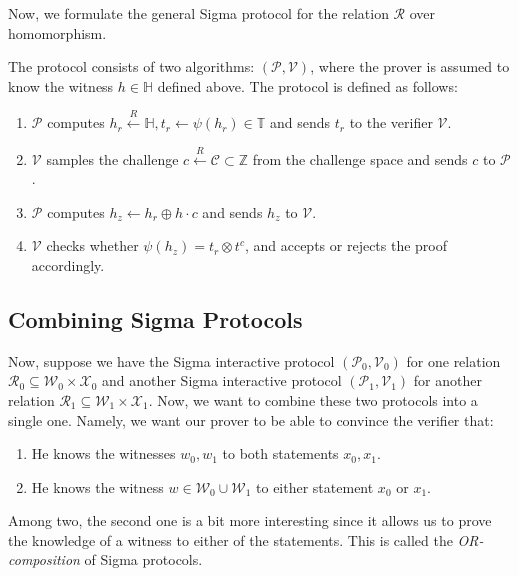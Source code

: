 \documentclass[../lecture-notes-148x210.tex]{subfiles}
\begin{document}
Now, we formulate the general Sigma protocol for the relation $\mathcal{R}$ over homomorphism.

\begin{definition}
    The protocol consists of two algorithms: $(\mathcal{P}, \mathcal{V})$, where the prover is assumed to know the witness $h \in \mathbb{H}$ defined above. The protocol is defined as follows:
    \begin{enumerate}
        \item $\mathcal{P}$ computes $h_r \xleftarrow{R} \mathbb{H}, t_r \gets \psi(h_r) \in \mathbb{T}$ and sends $t_r$ to the verifier $\mathcal{V}$.
        \item $\mathcal{V}$ samples the challenge $c \xleftarrow{R} \mathcal{C} \subset \mathbb{Z}$ from the challenge space and sends $c$ to $\mathcal{P}$.
        \item $\mathcal{P}$ computes $h_z \gets h_r \oplus h\cdot c$ and sends $h_z$ to $\mathcal{V}$.
        \item $\mathcal{V}$ checks whether $\psi(h_z) = t_r \otimes t^c$, and accepts or rejects the proof accordingly.
    \end{enumerate}
\end{definition}

\subsection{Combining Sigma Protocols}

Now, suppose we have the Sigma interactive protocol $(\mathcal{P}_0,\mathcal{V}_0)$ for one relation $\mathcal{R}_0 \subseteq \mathcal{W}_0 \times \mathcal{X}_0$ and another Sigma interactive protocol $(\mathcal{P}_1,\mathcal{V}_1)$ for another relation $\mathcal{R}_1 \subseteq \mathcal{W}_1 \times \mathcal{X}_1$. Now, we want to combine these two protocols into a single one. Namely, we want our prover to be able to convince the verifier that:
\begin{enumerate}
    \item He knows the witnesses $w_0,w_1$ to both statements $x_0,x_1$.
    \item He knows the witness $w \in \mathcal{W}_0 \cup \mathcal{W}_1$ to either statement $x_0$ or $x_1$.
\end{enumerate}

Among two, the second one is a bit more interesting since it allows us to prove the knowledge of a witness to either of the statements. This is called the \textit{OR-composition} of Sigma protocols.
\end{document}

